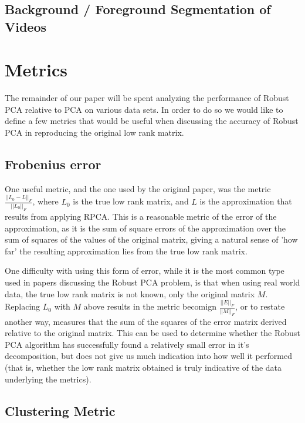 \documentclass[11pt]{scrartcl} %
\theoremstyle{plain}
\begin{document}
\subsection{Background / Foreground Segmentation of Videos}

\section{Metrics}
The remainder of our paper will be spent analyzing the performance of Robust PCA relative to PCA on various data sets. In order to do so we would like to define a few metrics that would be useful when discussing the accuracy of Robust PCA in reproducing the original low rank matrix.

\subsection{Frobenius error}
One useful metric, and the one used by the original paper, was the metric $\frac{||L_0 - L||_F}{||L_0||_F}$, where $L_0$ is the true low rank matrix, and $L$ is the approximation that results from applying RPCA. This is a reasonable metric of the error of the approximation, as it is the sum of square errors of the approximation over the sum of squares of the values of the original matrix, giving a natural sense of 'how far' the resulting approximation lies from the true low rank matrix.

One difficulty with using this form of error, while it is the most common type used in papers discussing the Robust PCA problem, is that when using real world data, the true low rank matrix is not known, only the original matrix $M$. Replacing $L_0$ with $M$ above results in the metric becomign $\frac{||E||_F}{||M||_F}$, or to restate another way, measures that the sum of the squares of the error matrix derived relative to the original matrix. This can be used to determine whether the Robust PCA algorithm has successfully found a relatively small error in it's decomposition, but does not give us much indication into how well it performed (that is, whether the low rank matrix obtained is truly indicative of the data underlying the metrics).

\subsection{Clustering Metric}
\end{document}
